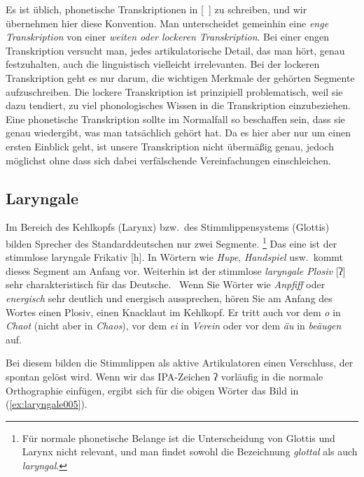 Es ist üblich, phonetische Transkriptionen in [~] zu schreiben, und wir übernehmen hier diese Konvention.
Man unterscheidet gemeinhin eine \textit{enge Transkription} von einer \textit{weiten oder lockeren Transkription}.
Bei einer engen Transkription versucht man, jedes artikulatorische Detail, das man hört, genau festzuhalten, auch die linguistisch vielleicht irrelevanten.
Bei der lockeren Transkription geht es nur darum, die wichtigen Merkmale der gehörten Segmente aufzuschreiben.
Die lockere Transkription ist prinzipiell problematisch, weil sie dazu tendiert, zu viel phonologisches Wissen in die Transkription einzubeziehen.
Eine phonetische Transkription sollte im Normalfall so beschaffen sein, dass sie genau wiedergibt, was man tatsächlich gehört hat.
Da es hier aber nur um einen ersten Einblick geht, ist unsere Transkription nicht übermäßig genau, jedoch möglichst ohne dass sich dabei verfälschende Vereinfachungen einschleichen.

\subsection{Laryngale}
\label{sec:laryngale}


Im Bereich des Kehlkopfs (Larynx) bzw.\ des Stimmlippensystems (Glottis) bilden Sprecher des Standarddeutschen nur zwei Segmente.%
\footnote{Für normale phonetische Belange ist die Unterscheidung von Glottis und Larynx nicht relevant, und man findet sowohl die Bezeichnung \textit{glottal} als auch \textit{laryngal}.}
Das eine ist der stimmlose laryngale Frikativ [h].
In Wörtern wie \textit{Hupe}, \textit{Handspiel} usw.\ kommt dieses Segment am Anfang vor.
Weiterhin ist der stimmlose \textit{laryngale Plosiv} [ʔ] sehr charakteristisch für das Deutsche.
\TuBegin~Wenn Sie Wörter wie \textit{Anpfiff} oder \textit{energisch} sehr deutlich und energisch aussprechen, hören Sie am Anfang des Wortes einen Plosiv, einen Knacklaut im Kehlkopf.
Er tritt auch vor dem \textit{o} in \textit{Chaot} (nicht aber in \textit{Chaos}), vor dem \textit{ei} in \textit{Verein} oder vor dem \textit{äu} in \textit{beäugen} auf.

Bei diesem bilden die Stimmlippen als aktive Artikulatoren einen Verschluss, der spontan gelöst wird.
Wenn wir das IPA-Zeichen ʔ vorläufig in die normale Orthographie einfügen, ergibt sich für die obigen Wörter das Bild in (\ref{ex:laryngale005}).

\Enl[2]

